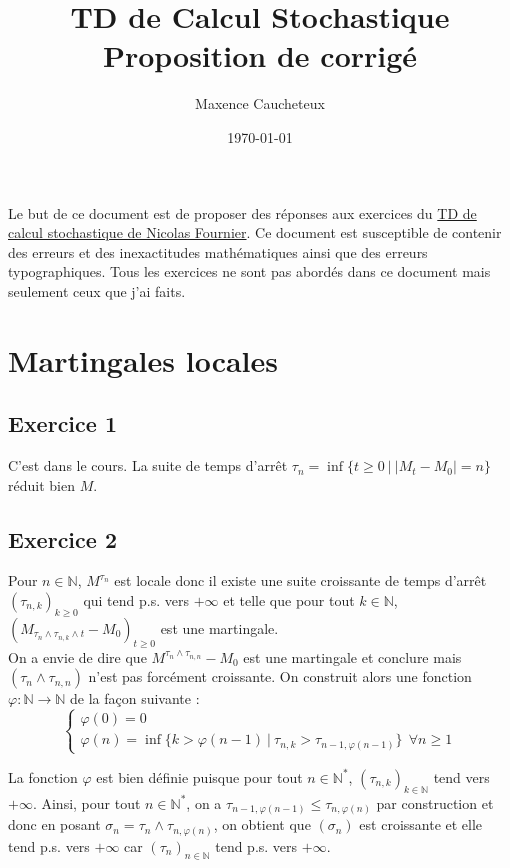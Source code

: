 \documentclass[a4paper,12pt]{article}
\title{TD de Calcul Stochastique \\
Proposition de corrigé}
\author{Maxence Caucheteux}
\date{\today}
\newcommand{\n}{\mathbb{N}}
\begin{document}
\maketitle
Le but de ce document est de proposer des réponses aux exercices du \href{https://perso.lpsm.paris/~nfournier/TDCS.pdf}{TD de calcul stochastique de Nicolas Fournier}. Ce document est susceptible de contenir des erreurs et des inexactitudes mathématiques ainsi que des erreurs typographiques. Tous les exercices ne sont pas abordés dans ce document mais seulement ceux que j'ai faits.

\tableofcontents
\newpage

\section{Martingales locales}

\subsection{Exercice 1}
C'est dans le cours. La suite de temps d'arrêt $\tau_n = \inf \{ t \geq 0 \ | \ |M_t -M_0|=n \}$ réduit bien $M$. \\

\subsection{Exercice 2} 
Pour $n \in \n$, $M^{\tau_n}$ est locale donc il existe une suite croissante de temps d'arrêt $(\tau_{n,k})_{k \geq 0}$ qui tend p.s. vers $+ \infty$ et telle que pour tout $k \in \n$, $(M_{\tau_n \wedge \tau_{n,k} \wedge t} - M_0)_{t \geq 0}$ est une martingale. \\

On a envie de dire que $M^{\tau_{n} \wedge \tau_{n,n}} - M_0$ est une martingale et conclure mais $(\tau_{n} \wedge \tau_{n,n})$ n'est pas forcément croissante. On construit alors une fonction $\varphi : \n \longrightarrow \n$ de la façon suivante : 
\[
\left\{
\begin{array}{l}
\varphi(0) = 0 \\
\varphi(n) = \inf \{ k > \varphi(n-1) \ | \ \tau_{n,k} > \tau_{n-1, \varphi(n-1)} \} \ \ \forall n \geq 1
\end{array}
\right.
\] 

La fonction $\varphi$ est bien définie puisque pour tout $n \in \n^*$, $(\tau_{n,k})_{k \in \n}$ tend vers $+ \infty$. Ainsi, pour tout $n \in \n^*$, on a $\tau_{n-1, \varphi(n-1)} \leq \tau_{n,\varphi (n)}$ par construction et donc en posant $\sigma_n=\tau_n \wedge \tau_{n,\varphi(n) }$, on obtient que $(\sigma_n)$ est croissante et elle tend p.s. vers $+ \infty$ car $(\tau_n)_{n \in \n}$ tend p.s. vers $+\infty$. \\
\end{document}
